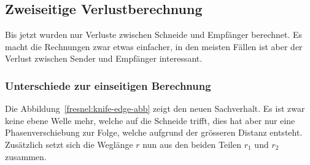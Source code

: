 \subsection{Zweiseitige Verlustberechnung}
Bis jetzt wurden nur Verluste zwischen Schneide und Empfänger berechnet.
Es macht die Rechnungen zwar etwas einfacher, in den meisten Fällen
ist aber der Verlust zwischen Sender und Empfänger interessant.


\subsubsection{Unterschiede zur einseitigen Berechnung}
Die Abbildung~\ref{fresnel:knife-edge-abb} zeigt den neuen Sachverhalt.
Es ist zwar keine ebene Welle mehr, welche auf die Schneide trifft,
dies hat aber nur eine Phasenverschiebung zur Folge,
welche aufgrund der grösseren Distanz entsteht.
Zusätzlich setzt sich die Weglänge $r$
nun aus den beiden Teilen $r_1$ und $r_2$ zusammen.

